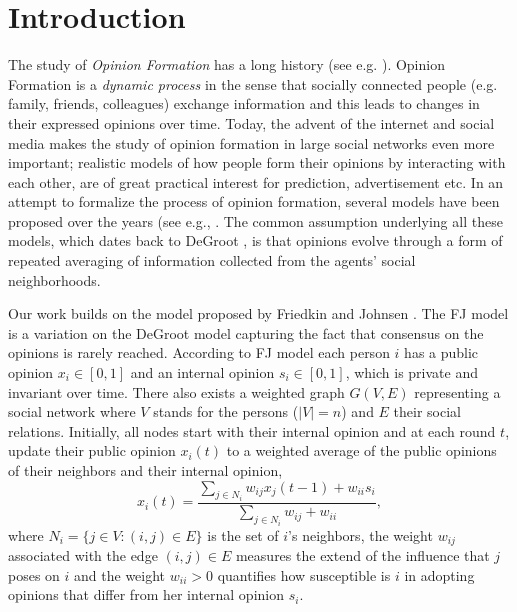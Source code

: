 \section{Introduction}

The study of \emph{Opinion Formation} has a long history (see e.g.
\cite{Jackson}). Opinion Formation is a \emph{dynamic process} in the sense
that socially connected people (e.g. family, friends, colleagues) exchange
information and this leads to changes in their expressed opinions over time.
Today, the advent of the internet and social media makes the study of opinion
formation in large social networks even more important; realistic models of how
people form their opinions by interacting with each other, are of great
practical interest for prediction, advertisement etc. In an attempt to
formalize the process of opinion formation, several models have been proposed
over the years (see e.g., \cite{DeGroot,FJ90,HK,DNAW00}.  The common assumption
underlying all these models, which dates back to DeGroot \cite{DeGroot}, is
that opinions evolve through a form of repeated averaging of information
collected from the agents' social neighborhoods.

Our work builds on the model proposed by Friedkin and Johnsen \cite{FJ90}.  The
FJ model is a variation on the DeGroot model capturing the fact that consensus
on the opinions is rarely reached.  According to FJ model each person $i$ has a
public opinion $x_i \in [0,1]$ and an internal opinion $s_i\in [0,1]$, which is
private and invariant over time. There also exists a weighted graph $G(V,E)$
representing a social network where $V$ stands for the persons ($|V|=n$) and
$E$ their social relations. Initially, all nodes start with their internal
opinion and at each round $t$, update their public opinion $x_i(t)$ to a
weighted average of the public opinions of their neighbors and their internal
opinion,
%
\begin{equation}\label{eq:FJ_model}
  x_i(t)= \frac{\sum_{j\in N_i}w_{ij}x_j(t-1) + w_{ii}s_i}{\sum_{j\in
      N_i}w_{ij}+w_{ii}},
\end{equation}
%
where $N_i =\{j \in V:(i,j) \in E\}$ is the set of $i$'s neighbors, the weight
$w_{ij}$ associated with the edge $(i,j) \in E$ measures the extend of the
influence that $j$ poses on $i$ and the weight $w_{ii}>0$ quantifies how
susceptible is $i$ in adopting opinions that differ from her internal opinion
$s_i$.

